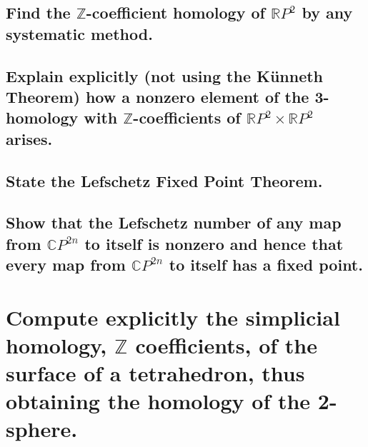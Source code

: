 \documentclass[10pt]{article}
\begin{document}
\advsection{}

\subsection{Find the $\mathbb{Z}$-coefficient homology of $\mathbb{R} P^2$ by any systematic
  method.}

\subsection{Explain explicitly (not using the K\"unneth Theorem) how a nonzero element of the
  3-homology with $\mathbb{Z}$-coefficients of $\mathbb{R} P^2 \times \mathbb{R} P^2$ arises.}

\advsection{}

\subsection{State the Lefschetz Fixed Point Theorem.}

\subsection{Show that the Lefschetz number of any map from $\mathbb{C} P^{2n}$ to itself is nonzero
  and hence that every map from $\mathbb{C} P^{2n}$ to itself has a fixed point. }

\section{Compute explicitly the simplicial homology, $\mathbb{Z}$ coefficients, of the surface of a
  tetrahedron, thus obtaining the homology of the 2-sphere.}
\end{document}
